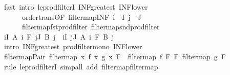 \begin{isabellebody}
\ {\isacharparenleft}{\kern0pt}fast\ intro{\isacharcolon}{\kern0pt}\ le{\isacharunderscore}{\kern0pt}prod{\isacharunderscore}{\kern0pt}filterI\ INF{\isacharunderscore}{\kern0pt}greatest\ INF{\isacharunderscore}{\kern0pt}lower{}\isanewline
\ \ \ \ \ \ order{\isacharunderscore}{\kern0pt}trans{\isacharbrackleft}{\kern0pt}OF\ filtermap{\isacharunderscore}{\kern0pt}INF{\isacharbrackright}{\kern0pt}\ {\isacartoucheopen}i\ {\isasymin}\ I{\isacartoucheclose}\ {\isacartoucheopen}j\ {\isasymin}\ J{\isacartoucheclose}\isanewline
\ \ \ \ \ \ filtermap{\isacharunderscore}{\kern0pt}fst{\isacharunderscore}{\kern0pt}prod{\isacharunderscore}{\kern0pt}filter\ filtermap{\isacharunderscore}{\kern0pt}snd{\isacharunderscore}{\kern0pt}prod{\isacharunderscore}{\kern0pt}filter{\isacharparenright}{\kern0pt}\isanewline
\ \ \isamarkupfalse%
\ {\isachardoublequoteopen}{\isacharparenleft}{\kern0pt}{\isasymSqinter}i{\isasymin}I{\isachardot}{\kern0pt}\ A\ i{\isacharparenright}{\kern0pt}\ {\isasymtimes}\isactrlsub F\ {\isacharparenleft}{\kern0pt}{\isasymSqinter}j{\isasymin}J{\isachardot}{\kern0pt}\ B\ j{\isacharparenright}{\kern0pt}\ {\isasymle}\ {\isacharparenleft}{\kern0pt}{\isasymSqinter}i{\isasymin}I{\isachardot}{\kern0pt}\ {\isasymSqinter}j{\isasymin}J{\isachardot}{\kern0pt}\ A\ i\ {\isasymtimes}\isactrlsub F\ B\ j{\isacharparenright}{\kern0pt}{\isachardoublequoteclose}\isanewline
\ \ \ \ \isamarkupfalse%
\ {\isacharparenleft}{\kern0pt}intro\ INF{\isacharunderscore}{\kern0pt}greatest\ prod{\isacharunderscore}{\kern0pt}filter{\isacharunderscore}{\kern0pt}mono\ INF{\isacharunderscore}{\kern0pt}lower{\isacharparenright}{\kern0pt}\isanewline
{}\isamarkupfalse%
%
\endisatagproof
{\isafoldproof}%
%
\isadelimproof
\isanewline
%
\endisadelimproof
\isanewline
{}\isamarkupfalse%
\ filtermap{\isacharunderscore}{\kern0pt}Pair{\isacharcolon}{\kern0pt}\ {\isachardoublequoteopen}filtermap\ {\isacharparenleft}{\kern0pt}{\isasymlambda}x{\isachardot}{\kern0pt}\ {\isacharparenleft}{\kern0pt}f\ x{\isacharcomma}{\kern0pt}\ g\ x{\isacharparenright}{\kern0pt}{\isacharparenright}{\kern0pt}\ F\ {\isasymle}\ filtermap\ f\ F\ {\isasymtimes}\isactrlsub F\ filtermap\ g\ F{\isachardoublequoteclose}\isanewline
%
\isadelimproof
\ \ %
\endisadelimproof
%
\isatagproof
{}\isamarkupfalse%
\ {\isacharparenleft}{\kern0pt}rule\ le{\isacharunderscore}{\kern0pt}prod{\isacharunderscore}{\kern0pt}filterI{\isacharcomma}{\kern0pt}\ simp{\isacharunderscore}{\kern0pt}all\ add{\isacharcolon}{\kern0pt}\ filtermap{\isacharunderscore}{\kern0pt}filtermap{\isacharparenright}{\kern0pt}%

\end{isabellebody}
